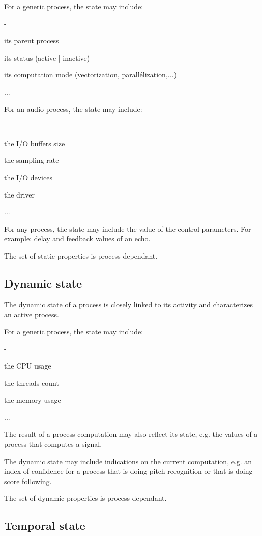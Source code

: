\documentclass{article}
\newenvironment{state}
{ \begin{list}
	{-}
	{	 \setlength{\leftmargin}{6mm}
	 	\setlength{\itemsep}{-3pt}}
}
{ \end{list} }
\begin{document}
For a generic process, the state may include:
\begin{state}
\item its parent process
\item its status (active | inactive)
\item its computation mode (vectorization, parallélization,...)
\item ...
\end{state}

For an audio process, the state may include:
\begin{state}
\item the I/O buffers size
\item the sampling rate
\item the I/O devices
\item the driver
\item ...
\end{state}

For any process, the state may include the value of the control parameters. For example: delay and feedback values of an echo.

The set of static properties is process dependant.


\subsection{Dynamic state}
The dynamic state of a process is closely linked to its activity and characterizes an active process.

For a generic process, the state may include:
\begin{state}
\item the CPU usage
\item the threads count
\item the memory usage
\item ...
\end{state}

The result of a process computation may also reflect its state, e.g. the values of a process that computes a signal.

The dynamic state may include indications on the current computation, e.g. an index of confidence for a process that is doing pitch recognition or that is doing score following.

The set of dynamic properties is process dependant.


\subsection{Temporal state}
\end{document}
